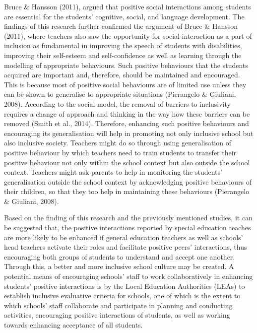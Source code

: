 \documentclass[11pt]{sig-alternate}
\begin{document}
\begin{large}
{Bruce \& Hansson (2011), argued that positive social interactions among students are essential for the students’ cognitive, social, and language development. The findings of this research further confirmed the argument of Bruce \& Hansson (2011), where teachers also saw the opportunity for social interaction as a part of inclusion as fundamental in improving the speech of students with disabilities, improving their self-esteem and self-confidence as well as learning through the modelling of appropriate behaviours. Such positive behaviours that the students acquired are important and, therefore, should be maintained and encouraged. This is because most of positive social behaviours are of limited use unless they can be shown to generalise to appropriate situations (Pierangelo \& Giuliani, 2008).  According to the social model, the removal of barriers to inclusivity requires a change of approach and thinking in the way how these barriers can be removed (Smith et al., 2014). Therefore, enhancing such positive behaviours and encouraging its generalisation will help in promoting not only inclusive school but also inclusive society. Teachers might do so through using generalisation of positive behaviour by which teachers need to train students to transfer their positive behaviour not only within the school context but also outside the school context. Teachers might ask parents to help in monitoring the students’ generalisation outside the school context by acknowledging positive behaviours of their children, so that they too help in maintaining these behaviours (Pierangelo \& Giuliani, 2008).  

Based on the finding of this research and the previously mentioned studies, it can be suggested that, the positive interactions reported by special education teaches are more likely to be enhanced if general education teachers as well as schools’ head teachers activate their roles and facilitate positive peers’ interactions, thus encouraging both groups of students to understand and accept one another. Through this, a better and more inclusive school culture may be created. A potential means of encouraging schools’ staff to work collaboratively in enhancing students’ positive interactions is by the Local Education Authorities (LEAs) to establish inclusive evaluative criteria for schools, one of which is the extent to which schools’ staff collaborate and participate in planning and conducting activities, encouraging positive interactions of students, as well as working towards enhancing acceptance of all students.

}
\end{large}
\end{document}
